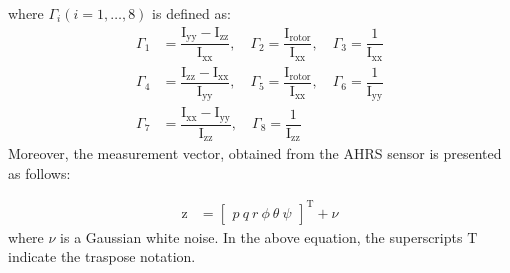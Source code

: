 \documentclass[3p,times]{elsarticle}
\begin{document}
where $\Gamma_i (i = 1, \ldots, 8)$ is defined as:
\begin{equation}
	\begin{split}
		\Gamma_1 &= \dfrac{\mathrm{I}_{\text{yy}} - \mathrm{I}_{\text{zz}}}{\mathrm{I}_{\text{xx}}}, \quad \Gamma_2 = \dfrac{\mathrm{I}_{\text{rotor}}}{\mathrm{I}_{\text{xx}}}, \quad \Gamma_3 = \dfrac{1}{\mathrm{I}_{\text{xx}}}\\ \Gamma_4 &= \dfrac{\mathrm{I}_{\text{zz}} - \mathrm{I}_{\text{xx}}}{\mathrm{I}_{\text{yy}}}, \quad \Gamma_5 = \dfrac{\mathrm{I}_{\text{rotor}}}{\mathrm{I}_{\text{xx}}}, \quad \Gamma_6 = \dfrac{1}{\mathrm{I}_{\text{yy}}} \\ \Gamma_7 &= \dfrac{\mathrm{I}_{\text{xx}} - \mathrm{I}_{\text{yy}}}{\mathrm{I}_{\text{zz}}}, \quad \Gamma_8 = \dfrac{1}{\mathrm{I}_{\text{zz}}}
	\end{split}
\end{equation}
Moreover, the measurement vector, obtained from the AHRS sensor is presented as follows:

\begin{equation}
\begin{split}
\boldsymbol{\mathrm{z}} &= \begin{bmatrix}
p \
q \
r \
\phi \
\theta \
\psi
\end{bmatrix}^\mathrm{T} + \nu
\end{split}
\end{equation}
where $\nu$ is a Gaussian white noise. In the above equation, the superscripts $\mathrm{T}$ indicate the traspose notation.
\end{document}
